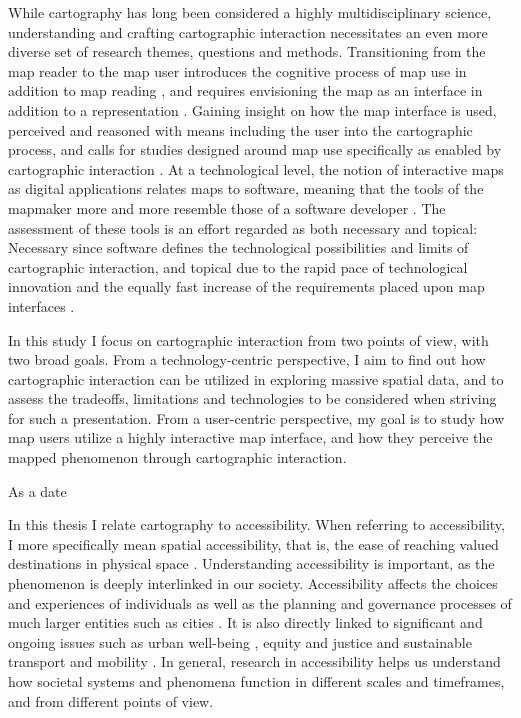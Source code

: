 While cartography has long been considered a highly multidisciplinary science,
understanding and crafting cartographic interaction necessitates an even
more diverse set of research themes, questions and methods.
Transitioning from the map reader to the map user
introduces the cognitive process of map use in addition to map reading
\parencite{mac2015, liu2010},
and requires envisioning the map as an interface in addition to a representation
\parencite{rot2013b}.
Gaining insight on how the map interface is used, perceived and reasoned with
means including the user into the cartographic process,
and calls for studies designed around map use specifically as enabled by cartographic interaction
\parencite{rot2017}.
At a technological level,
the notion of interactive maps as digital applications relates maps to software,
meaning that the tools of the mapmaker
more and more resemble those of a software developer \parencite{rot2014}.
The assessment of these tools is an effort regarded as both necessary
and topical:
Necessary since software defines the technological possibilities and limits
of cartographic interaction,
and topical due to the rapid pace of technological innovation
and the equally fast increase of the requirements placed upon map interfaces
\parencite{rot2021}.

In this study I focus on cartographic interaction from two points of view,
with two broad goals.
From a technology-centric perspective,
I aim to find out how cartographic interaction can be utilized in exploring
massive spatial data,
and to assess the tradeoffs, limitations and technologies to be considered when
striving for such a presentation. %
From a user-centric perspective,
my goal is to study how
map users utilize a highly interactive map interface,
and how they perceive the mapped phenomenon
through cartographic interaction.

As a date

In this thesis I relate cartography to accessibility.
When referring to accessibility,
I more specifically mean spatial accessibility, that is,
the ease of reaching valued destinations in physical space \parencite{lev2020}.
Understanding accessibility is important,
as the phenomenon is deeply interlinked in our society.
Accessibility affects the choices and experiences of individuals \parencite{kwa1998, kwa2003}
as well as the planning and governance processes
of much larger entities such as cities \parencite{cur2010, low2015}.
It is also directly linked to significant and ongoing issues such as
urban well-being \parencite{zha2011},
equity and justice \parencite{per2017, che2020}
and sustainable transport and mobility \parencite{son2017, mah2019}.
In general, research in accessibility helps us understand
how societal systems and phenomena function
in different scales and timeframes, and from different points of view.

